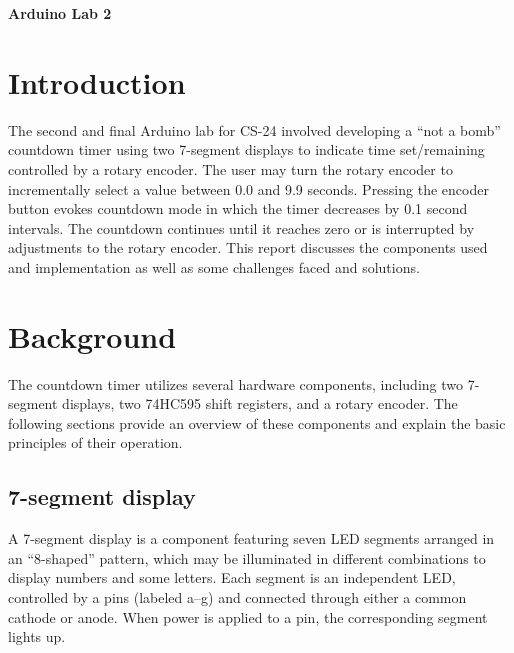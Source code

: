 \documentclass[fleqn]{article}
\begin{document}
\pagestyle{fancy}
\fancyhead{}
\fancyhead[R]{\thepage}
\fancyfoot{}


\begin{center}
    \Large{\textbf{Arduino Lab 2}}\\
\end{center}
\vspace{0.25in}

\section*{Introduction}
The second and final Arduino lab for CS-24 involved developing a ``not a bomb'' countdown timer using two 7-segment displays to indicate time set/remaining controlled by a rotary encoder. The user may turn the rotary encoder to incrementally select a value between 0.0 and 9.9 seconds. Pressing the encoder button evokes countdown mode in which the timer decreases by 0.1 second intervals. The countdown continues until it reaches zero or is interrupted by adjustments to the rotary encoder. This report discusses the components used and implementation as well as some challenges faced and solutions.
\section*{Background}
The countdown timer utilizes several hardware components, including two 7-segment displays, two 74HC595 shift registers, and a rotary encoder. The following sections provide an overview of these components and explain the basic principles of their operation.
\subsection*{7-segment display}
A 7-segment display is a component featuring seven LED segments arranged in an ``8-shaped'' pattern, which may be illuminated in different combinations to display numbers and some letters. Each segment is an independent LED, controlled by a pins (labeled a–g) and connected through either a common cathode or anode. When power is applied to a pin, the corresponding segment lights up.
\end{document}

